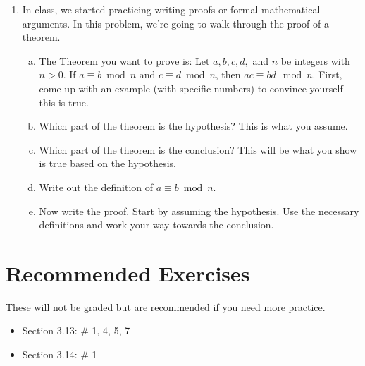 \documentclass[12pt]{amsart}
\theoremstyle{plain}
\theoremstyle{definition}
\begin{document}
\begin{enumerate}[1.]
\begin{enumerate}[a.]
			\begin{framed}
			\vspace{1in}
			\end{framed}
		\end{enumerate}
	\item In class, we started practicing writing proofs or formal mathematical arguments.  In this problem, we're going to walk through the proof of a theorem.
	\begin{enumerate}[a.]
		\item The Theorem you want to prove is: Let $a,b,c,d,$ and $n$ be integers with $n > 0$.  If $a \equiv b \bmod n$ and $c \equiv d \bmod n$, then $ac \equiv bd \mod n$.  First, come up with an example (with specific numbers) to convince yourself this is true.
		\begin{framed}
		\vspace{2in}
		\end{framed}
		\item Which part of the theorem is the hypothesis?  This is what you assume.
		\begin{framed}
		\vspace{1.5in}
		\end{framed}
		\newpage \item Which part of the theorem is the conclusion? This will be what you show is true based on the hypothesis.
		\begin{framed}
		\vspace{1in}
		\end{framed}
		\item Write out the definition of $a \equiv b \bmod n$.
		\begin{framed}
		\vspace{1in}
		\end{framed}
		\item Now write the proof.  Start by assuming the hypothesis.  Use the necessary definitions and work your way towards the conclusion.
		\begin{framed}
		\vspace{3.5in}
		\end{framed}
	\end{enumerate}
\end{enumerate}

\section{Recommended Exercises}
\noindent These will not be graded but are recommended if you need more practice.
\begin{itemize}
	\item Section 3.13: \# 1, 4, 5, 7
	\item Section 3.14: \# 1
\end{itemize}
	
\end{document}
